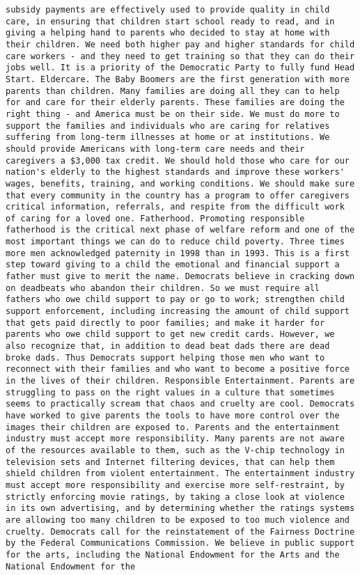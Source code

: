 \documentclass[
]{article}
\begin{document}
\begin{verbatim}
subsidy payments are effectively used to provide quality in child care, in ensuring that children start school ready to read, and in giving a helping hand to parents who decided to stay at home with their children. We need both higher pay and higher standards for child care workers - and they need to get training so that they can do their jobs well. It is a priority of the Democratic Party to fully fund Head Start. Eldercare. The Baby Boomers are the first generation with more parents than children. Many families are doing all they can to help for and care for their elderly parents. These families are doing the right thing - and America must be on their side. We must do more to support the families and individuals who are caring for relatives suffering from long-term illnesses at home or at institutions. We should provide Americans with long-term care needs and their caregivers a $3,000 tax credit. We should hold those who care for our nation's elderly to the highest standards and improve these workers' wages, benefits, training, and working conditions. We should make sure that every community in the country has a program to offer caregivers critical information, referrals, and respite from the difficult work of caring for a loved one. Fatherhood. Promoting responsible fatherhood is the critical next phase of welfare reform and one of the most important things we can do to reduce child poverty. Three times more men acknowledged paternity in 1998 than in 1993. This is a first step toward giving to a child the emotional and financial support a father must give to merit the name. Democrats believe in cracking down on deadbeats who abandon their children. So we must require all fathers who owe child support to pay or go to work; strengthen child support enforcement, including increasing the amount of child support that gets paid directly to poor families; and make it harder for parents who owe child support to get new credit cards. However, we also recognize that, in addition to dead beat dads there are dead broke dads. Thus Democrats support helping those men who want to reconnect with their families and who want to become a positive force in the lives of their children. Responsible Entertainment. Parents are struggling to pass on the right values in a culture that sometimes seems to practically scream that chaos and cruelty are cool. Democrats have worked to give parents the tools to have more control over the images their children are exposed to. Parents and the entertainment industry must accept more responsibility. Many parents are not aware of the resources available to them, such as the V-chip technology in television sets and Internet filtering devices, that can help them shield children from violent entertainment. The entertainment industry must accept more responsibility and exercise more self-restraint, by strictly enforcing movie ratings, by taking a close look at violence in its own advertising, and by determining whether the ratings systems are allowing too many children to be exposed to too much violence and cruelty. Democrats call for the reinstatement of the Fairness Doctrine by the Federal Communications Commission. We believe in public support for the arts, including the National Endowment for the Arts and the National Endowment for the 
\end{verbatim}
\end{document}
